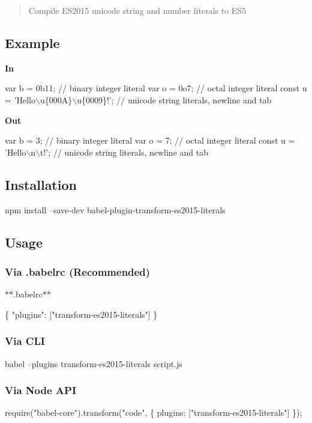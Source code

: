 \begin{quote}
Compile E\+S2015 unicode string and number literals to E\+S5 \end{quote}


\subsection*{Example}

{\bfseries In}


\begin{DoxyCode}
var b = 0b11; // binary integer literal
var o = 0o7; // octal integer literal
const u = 'Hello\(\backslash\)u\{000A\}\(\backslash\)u\{0009\}!'; // unicode string literals, newline and tab
\end{DoxyCode}


{\bfseries Out}


\begin{DoxyCode}
var b = 3; // binary integer literal
var o = 7; // octal integer literal
const u = 'Hello\(\backslash\)n\(\backslash\)t!'; // unicode string literals, newline and tab
\end{DoxyCode}


\subsection*{Installation}


\begin{DoxyCode}
npm install --save-dev babel-plugin-transform-es2015-literals
\end{DoxyCode}


\subsection*{Usage}

\subsubsection*{Via {\ttfamily .babelrc} (Recommended)}

$\ast$$\ast$.babelrc$\ast$$\ast$


\begin{DoxyCode}
\{
  "plugins": ["transform-es2015-literals"]
\}
\end{DoxyCode}


\subsubsection*{Via C\+LI}


\begin{DoxyCode}
babel --plugins transform-es2015-literals script.js
\end{DoxyCode}


\subsubsection*{Via Node A\+PI}


\begin{DoxyCode}
require("babel-core").transform("code", \{
  plugins: ["transform-es2015-literals"]
\});
\end{DoxyCode}
 